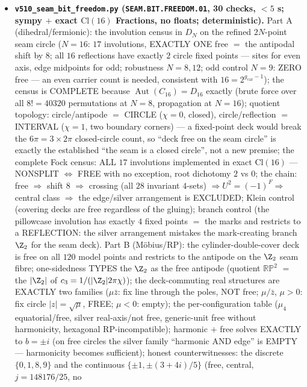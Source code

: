 \documentclass[11pt]{article}
\providecommand{\cthree}{c_3}\providecommand{\phiz}{\varphi_0^{\mathrm{ret}}}
\providecommand{\gcar}{g_{\mathrm{car}}}\providecommand{\Nfam}{N_{\mathrm{fam}}}
\providecommand{\Aut}{\operatorname{Aut}}
\begin{document}
\begin{itemize}[leftmargin=1.5em]
\item \textbf{\texttt{v510\_seam\_bit\_freedom.py} (\texttt{SEAM.BIT.FREEDOM.01}, 30 checks, $<5$ s;
sympy $+$ exact $\mathrm{Cl}(16)$ Fractions, no floats; deterministic).} Part A (dihedral/fermionic):
the involution census in $D_N$ on the refined $2N$-point seam circle ($N=16$: $17$ involutions,
EXACTLY ONE free $=$ the antipodal shift by $8$; all $16$ reflections have exactly $2$ circle fixed
points --- sites for even axis, edge midpoints for odd; robustness $N=8,12$; odd control $N=9$: ZERO
free --- an even carrier count is needed, consistent with $16=2^{\gcar-1}$); the census is COMPLETE
because $\Aut(C_{16})=D_{16}$ exactly (brute force over all $8!=40320$ permutations at $N=8$,
propagation at $N=16$); quotient topology: circle/antipode $=$ CIRCLE ($\chi=0$, closed),
circle/reflection $=$ INTERVAL ($\chi=1$, two boundary corners) --- a fixed-point deck would break
the $6\pi=3\times2\pi$ closed-circle count, so ``deck free on the seam circle'' is exactly the
established ``the seam is a closed circle'', not a new premise; the complete Fock census: ALL $17$
involutions implemented in exact $\mathrm{Cl}(16)$ --- NONSPLIT $\iff$ FREE with no exception, root
dichotomy $2$ vs $0$; the chain: free $\Rightarrow$ shift $8$ $\Rightarrow$ crossing (all $28$
invariant $4$-sets) $\Rightarrow U^2=(-1)^F\Rightarrow$ central class $\Rightarrow$ the edge/silver
arrangement is EXCLUDED; Klein control (covering decks are free regardless of the gluing); branch
control (the pillowcase involution has exactly $4$ fixed points $=$ the marks and restricts to a
REFLECTION: the silver arrangement mistakes the mark-creating branch $\Z_2$ for the seam deck).
Part B (M\"obius/RP): the cylinder-double-cover deck is free on all $120$ model points and restricts
to the antipode on the $\Z_2$ seam fibre; one-sidedness TYPES the $\Z_2$ as the free antipode
(quotient $\mathbb{RP}^2$ $=$ the $|\Z_2|$ of $\cthree=1/(|\Z_2|2\pi\chi)$); the deck-commuting real
structures are EXACTLY two families ($\mu\bar z$: fix line through the poles, NOT free; $\mu/\bar z$,
$\mu>0$: fix circle $|z|=\sqrt\mu$, FREE; $\mu<0$: empty); the per-configuration table ($\mu_4$
equatorial/free, silver real-axis/not free, generic-unit free without harmonicity, hexagonal
RP-incompatible); harmonic $+$ free solves EXACTLY to $b=\pm i$ (on free circles the silver family
``harmonic AND edge'' is EMPTY --- harmonicity becomes sufficient); honest counterwitnesses: the
discrete $\{0,1,8,9\}$ and the continuous $\{\pm1,\pm(3{+}4i)/5\}$ (free, central, $j=148176/25$, no

\end{itemize}
\end{document}
